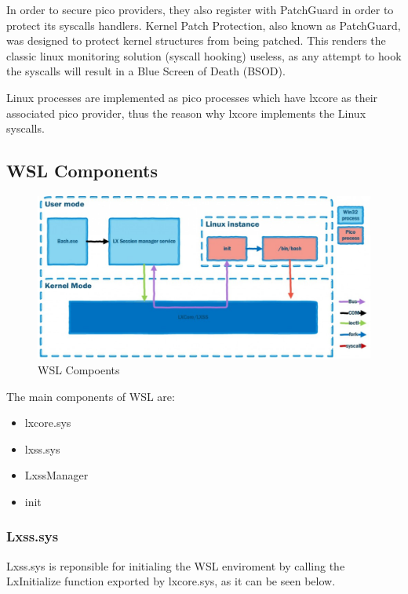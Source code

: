             In order to secure pico providers, they also register with PatchGuard in order to protect its syscalls handlers. Kernel Patch
            Protection, also known as PatchGuard, was designed to protect kernel structures from being patched. This renders the classic linux
            monitoring solution (syscall hooking) useless, as any attempt to hook the syscalls will result in a Blue Screen of Death (BSOD).


        Linux processes are implemented as pico processes which have lxcore as their associated pico provider, thus the reason why lxcore implements
        the Linux syscalls.


        \subsection{WSL Components}
            \begin{figure}[H]
                \includegraphics[width=\linewidth]{img/wsl_components.png}
                \caption{WSL Compoents}
                \label{fig:wsl_components}
            \end{figure}
            
            The main components of WSL are:
            \begin{itemize}
                \item lxcore.sys
                \item lxss.sys
                \item LxssManager
                \item init
            \end{itemize}

            \subsubsection{Lxss.sys}
            Lxss.sys is reponsible for initialing the WSL enviroment by calling the LxInitialize function exported by lxcore.sys, as it can be
            seen below.

